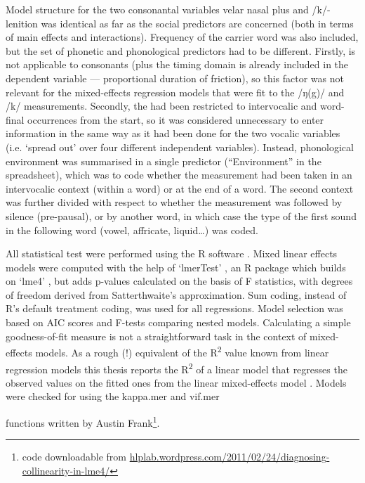 Model structure for the two consonantal variables velar nasal plus and /k/-lenition was identical as far as the social predictors are concerned (both in terms of main effects and interactions).
Frequency of the carrier word was also included, but the set of phonetic and phonological predictors had to be different.
Firstly,  is not applicable to consonants (plus the timing domain is already included in the dependent variable --- proportional duration of friction), so this factor was not relevant for the mixed-effects regression models that were fit to the /ŋ(g)/ and /k/ measurements.
Secondly, the  had been restricted to intervocalic and word-final occurrences from the start, so it was considered unnecessary to enter information in the same way as it had been done for the two vocalic variables (i.e. `spread out' over four different independent variables).
Instead, phonological environment was summarised in a single predictor (``Environment'' in the spreadsheet), which was to code whether the measurement had been taken in an intervocalic context (within a word) or at the end of a word.
The second context was further divided with respect to whether the measurement was followed by silence (pre-pausal), or by another word, in which case the type of the first sound in the following word (vowel, affricate, liquid\ldots) was coded.

All statistical test were performed using the R software \parencite{R}.
Mixed linear effects models were computed with the help of `lmerTest' \parencite{lmerTest}, an R package which builds on `lme4' \parencite{lme4}, but adds p-values calculated on the basis of F statistics, with degrees of freedom derived from Satterthwaite's approximation.
Sum coding, instead of R's default treatment coding, was used for all regressions.
Model selection was based on AIC scores and F-tests comparing nested models.
Calculating a simple goodness-of-fit measure is not a straightforward task in the context of mixed-effects models.
As a rough (!) equivalent of the R\textsuperscript{2} value known from linear regression models this thesis reports the R\textsuperscript{2} of a linear model that regresses the observed values on the fitted ones from the linear mixed-effects model \parencite[cf.][]{glmwiki}.
Models were checked for  using the kappa.mer and vif.mer

functions written by Austin Frank\footnote{code downloadable from \url{hlplab.wordpress.com/2011/02/24/diagnosing-collinearity-in-lme4/}}.